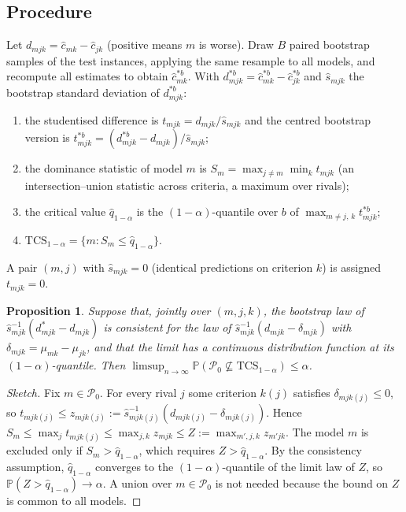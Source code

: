 \documentclass[11pt,a4paper]{article}
\newtheorem{proposition}{Proposition}
\renewcommand{\Pr}{\mathbb{P}}
\begin{document}
\subsection{Procedure}
Let $d_{mjk}=\hat c_{mk}-\hat c_{jk}$ (positive means $m$ is worse). Draw $B$ paired bootstrap samples of the test instances, applying the same resample to all models, and recompute all estimates to obtain $\hat c^{*b}_{mk}$. With $d^{*b}_{mjk}=\hat c^{*b}_{mk}-\hat c^{*b}_{jk}$ and $\hat s_{mjk}$ the bootstrap standard deviation of $d^{*b}_{mjk}$:
\begin{enumerate}
\item the studentised difference is $t_{mjk}=d_{mjk}/\hat s_{mjk}$ and the centred bootstrap version is $t^{*b}_{mjk}=(d^{*b}_{mjk}-d_{mjk})/\hat s_{mjk}$;
\item the dominance statistic of model $m$ is $S_m=\max_{j\ne m}\min_{k} t_{mjk}$ (an intersection--union statistic across criteria, a maximum over rivals);
\item the critical value $\hat q_{1-\alpha}$ is the $(1-\alpha)$-quantile over $b$ of $\max_{m\ne j,\,k} t^{*b}_{mjk}$;
\item $\mathrm{TCS}_{1-\alpha}=\{m: S_m\le \hat q_{1-\alpha}\}$.
\end{enumerate}
A pair $(m,j)$ with $\hat s_{mjk}=0$ (identical predictions on criterion $k$) is assigned $t_{mjk}=0$.

\begin{proposition}\label{prop:cov}
Suppose that, jointly over $(m,j,k)$, the bootstrap law of $\hat s_{mjk}^{-1}(d^{*}_{mjk}-d_{mjk})$ is consistent for the law of $\hat s_{mjk}^{-1}(d_{mjk}-\delta_{mjk})$ with $\delta_{mjk}=\mu_{mk}-\mu_{jk}$, and that the limit has a continuous distribution function at its $(1-\alpha)$-quantile. Then $\limsup_{n\to\infty}\Pr(\mathcal{P}_0\not\subseteq \mathrm{TCS}_{1-\alpha})\le\alpha$.
\end{proposition}
\begin{proof}[Sketch]
Fix $m\in\mathcal{P}_0$. For every rival $j$ some criterion $k(j)$ satisfies $\delta_{mjk(j)}\le0$, so $t_{mjk(j)}\le z_{mjk(j)}:=\hat s_{mjk(j)}^{-1}(d_{mjk(j)}-\delta_{mjk(j)})$. Hence $S_m\le\max_j t_{mjk(j)}\le\max_{j,k}z_{mjk}\le Z:=\max_{m',j,k}z_{m'jk}$. The model $m$ is excluded only if $S_m>\hat q_{1-\alpha}$, which requires $Z>\hat q_{1-\alpha}$. By the consistency assumption, $\hat q_{1-\alpha}$ converges to the $(1-\alpha)$-quantile of the limit law of $Z$, so $\Pr(Z>\hat q_{1-\alpha})\to\alpha$. A union over $m\in\mathcal{P}_0$ is not needed because the bound on $Z$ is common to all models.
\end{proof}
\end{document}
